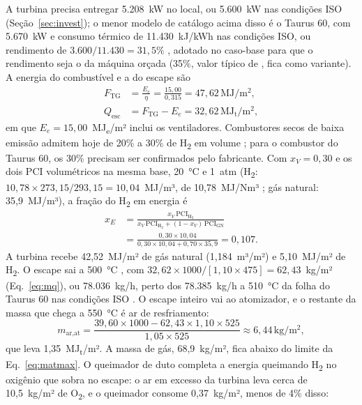 \documentclass[10pt,a4paper,twocolumn]{article}
\newcommand{\MJt}{MJ\textsubscript{t}}
\newcommand{\MJe}{MJ\textsubscript{e}}
\newcommand{\Ht}{H\textsubscript{2}}
\newcommand{\Ot}{O\textsubscript{2}}
\newcommand{\un}[1]{\,\mathrm{#1}}
\begin{document}
A turbina precisa entregar 5.208~kW no local, ou 5.600~kW nas condições ISO (Seção~\ref{sec:invest}); o menor modelo de catálogo acima disso é o Taurus 60, com 5.670~kW e consumo térmico de 11.430~kJ/kWh nas condições ISO, ou rendimento de $3.600/11.430 = 31{,}5\%$ \cite{gtw2018,solar2026}, adotado no caso-base para que o rendimento seja o da máquina orçada (35\%, valor típico de \cite{boyce2012}, fica como variante). A energia do combustível e a do escape são
\begin{align}
F_{\text{TG}} &= \frac{E_e}{\eta} = \frac{15{,}00}{0{,}315} = 47{,}62\un{MJ/m^2}, \label{eq:tg}\\
Q_{\text{esc}} &= F_{\text{TG}} - E_e = 32{,}62\un{MJ_t/m^2}, \nonumber
\end{align}
em que $E_e = 15{,}00$~\MJe/m² inclui os ventiladores. Combustores secos de baixa emissão admitem hoje de 20\% a 30\% de \Ht{} em volume \cite{netl2022}; para o combustor do Taurus 60, os 30\% precisam ser confirmados pelo fabricante. Com $x_V = 0{,}30$ e os dois PCI volumétricos na mesma base, 20~°C e 1~atm (\Ht: $10{,}78 \times 273{,}15/293{,}15 = 10{,}04$~MJ/m³, de 10,78~MJ/Nm³ \cite{cengel2013}; gás natural: 35,9~MJ/m³), a fração do \Ht{} em energia é
\begin{equation}
\begin{split}
x_E &= \frac{x_V\,\mathrm{PCI}_{\mathrm{H_2}}}{x_V\,\mathrm{PCI}_{\mathrm{H_2}} + (1-x_V)\,\mathrm{PCI}_{\text{GN}}}\\
&= \frac{0{,}30 \times 10{,}04}{0{,}30 \times 10{,}04 + 0{,}70 \times 35{,}9} = 0{,}107.
\end{split} \label{eq:xe}
\end{equation}
A turbina recebe 42,52~MJ/m² de gás natural (1,184~m³/m²) e 5,10~MJ/m² de \Ht. O escape sai a 500~°C \cite{boyce2012}, com $32{,}62 \times 1000/[1{,}10 \times 475] = 62{,}43$~kg/m² (Eq.~\eqref{eq:mq}), ou 78.036~kg/h, perto dos 78.385~kg/h a 510~°C da folha do Taurus 60 nas condições ISO \cite{solar2026}. O escape inteiro vai ao atomizador, e o restante da massa que chega a 550~°C é ar de resfriamento:
\begin{equation}
m_{\text{ar,at}} = \frac{39{,}60 \times 1000 - 62{,}43 \times 1{,}10 \times 525}{1{,}05 \times 525} \approx 6{,}44\un{kg/m^2}, \label{eq:marat}
\end{equation}
que leva 1,35~\MJt/m². A massa de gás, 68,9~kg/m², fica abaixo do limite da Eq.~\eqref{eq:matmax}. O queimador de duto completa a energia queimando \Ht{} no oxigênio que sobra no escape: o ar em excesso da turbina leva cerca de 10,5~kg/m² de \Ot, e o queimador consome 0,37~kg/m², menos de 4\% disso:
\end{document}
